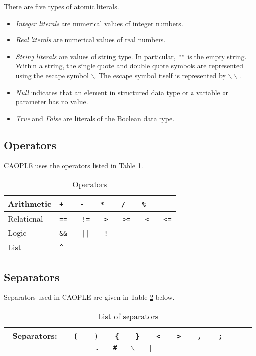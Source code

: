 \documentclass[english]{report}
\begin{document}
There are five types of atomic literals. 
\begin{itemize}
\item \emph{Integer literals} are numerical values of integer numbers. 
\item \emph{Real literals} are numerical values of real numbers. 
\item \emph{String literals} are values of string type. In particular, \texttt{""} is the empty string. Within a string, the single quote and double quote symbols are represented using the escape symbol $\backslash$. The escape symbol itself is represented by $\backslash\backslash$. 
\item \emph{Null} indicates that an element in structured data type or a variable or parameter has no value. 
\item \emph{True} and \emph{False} are literals of the Boolean data type. 
\end{itemize}
	
\subsection{Operators}

CAOPLE uses the operators listed in Table \ref{tbl:TabOperators}.
\begin{table}[h]
\caption{Operators}\label{tbl:TabOperators}
\begin{center}
\begin{tabular}{|l|l|}
\hline
Arithmetic & \texttt{+}~~~  \texttt{-}~~~ \texttt{*}~~~ \texttt{/}~~~ \texttt{\%}\\
\hline 
Relational &\texttt{==}~~~ \texttt{!=}~~~ \texttt{>}~~~ \texttt{>=}~~~ \texttt{<}~~~ \texttt{<=}\\
\hline
Logic  &\texttt{\&\&}~~~ \texttt{||}~~~ \texttt{!}\\
\hline
List &\texttt{\^~}\\
\hline
\end{tabular}
\end{center}
\end{table}%

\subsection{Separators}

Separators used in CAOPLE are given in Table \ref{tbl:TabSeparators} below. 

\begin{table}[h]
\caption{List of separators}\label{tbl:TabSeparators}
\begin{center}
\begin{tabular}{|c|c|}
\hline
Separators: ~~~\texttt{(}~~~ \texttt{)}~~~ \texttt{\{}~~~ \texttt{\}}~~~ \texttt{<}~~~ \texttt{>}~~~ \texttt{,}~~~ \texttt{;}~~~ \texttt{.}~~~\texttt{\#}~~~\texttt{$\backslash$}~~~\texttt{|}\\
\hline
\end{tabular}
\end{center}
\end{table}%
\end{document}
